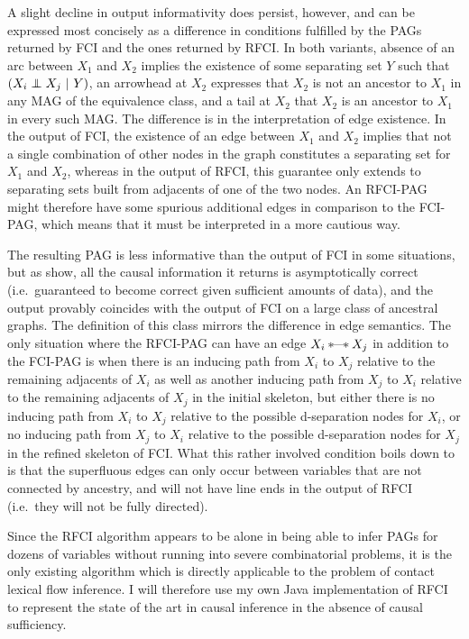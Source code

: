 A slight decline in output informativity does persist, however, and can be expressed most concisely as a difference in conditions fulfilled by the PAGs returned by FCI and the ones returned by RFCI. In both variants, absence of an arc between $X_1$ and $X_2$ implies the existence of some separating set $Y$ such that $(X_i \indep X_j\ |\ Y)$, an arrowhead at $X_2$ expresses that $X_2$ is not an ancestor to $X_1$ in any MAG of the equivalence class, and a tail at $X_2$ that $X_2$ is an ancestor to $X_1$ in every such MAG. The difference is in the interpretation of edge existence. In the output of FCI, the existence of an edge between $X_1$ and $X_2$ implies that not a single combination of other nodes in the graph constitutes a separating set for $X_1$ and $X_2$, whereas in the output of RFCI, this guarantee only extends to separating sets built from adjacents of one of the two nodes. An RFCI-PAG might therefore have some spurious additional edges in comparison to the FCI-PAG, which means that it must be 
interpreted in a more cautious way.

The resulting PAG is less informative than the output of FCI in some situations, but as \cite{colombo_ea_2012} show, all the causal information it returns is asymptotically correct (i.e.\ guaranteed to become correct given sufficient amounts of data), and the output provably coincides with the output of FCI on a large class of ancestral graphs. The definition of this class mirrors the difference in edge semantics. The only situation where the RFCI-PAG can have an edge $X_i \kern 2pt\hbox{$\ast$}\kern-1.5pt\hbox{---}\kern-1.5pt\hbox{$\ast$}\kern 2pt X_j$ in addition to the FCI-PAG is when there is an inducing path from $X_i$ to $X_j$ relative to the remaining adjacents of $X_i$ as well as another inducing path from $X_j$ to $X_i$ relative to the remaining adjacents of $X_j$ in the initial skeleton, but either there is no inducing path from $X_i$ to $X_j$ relative to the possible d-separation nodes for $X_i$, or no inducing path from $X_j$ to $X_i$ relative to the possible d-separation nodes for $X_j$ in the refined skeleton of FCI. What this rather involved condition boils 
down to is that the superfluous edges can only occur between variables that are not connected by ancestry, and will not have line ends in the output of RFCI (i.e.\ they will not be fully directed).

\largerpage
Since the RFCI algorithm appears to be alone in being able to infer PAGs for dozens of variables without running into severe combinatorial problems, it is the only existing algorithm which is directly applicable to the problem of contact lexical flow inference. I will therefore use my own Java implementation of RFCI to represent the state of the art in causal inference in the absence of causal sufficiency.

